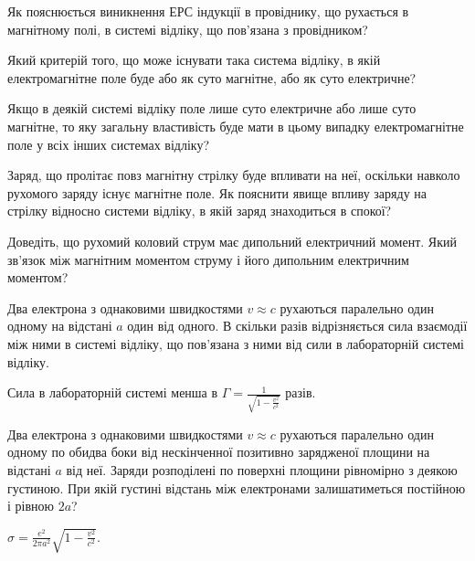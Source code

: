 \begin{problem}
    Як пояснюється виникнення ЕРС індукції в провіднику, що рухається в магнітному полі, в системі відліку, що  пов'язана з провідником?
\end{problem}

\begin{problem}
    Який критерій того, що може існувати така система відліку, в якій електромагнітне поле буде або як суто магнітне, або як суто електричне?
\end{problem}

\begin{problem}
    Якщо в деякій системі відліку поле лише суто електричне або лише суто магнітне, то яку загальну властивість буде мати в цьому випадку електромагнітне поле у всіх інших системах відліку?
\end{problem}

\begin{problem}
    Заряд, що пролітає повз магнітну стрілку буде впливати на неї, оскільки навколо рухомого заряду існує магнітне поле. Як пояснити явище впливу заряду на стрілку відносно системи відліку, в якій заряд знаходиться в спокої?
\end{problem}

\begin{problem}
    Доведіть, що рухомий коловий струм має дипольний електричний момент. Який зв'язок між магнітним моментом струму і його дипольним електричним моментом?
\end{problem}

\begin{problem}
    Два електрона з однаковими швидкостями $v \approx c$ рухаються паралельно один одному на відстані $a$ один від одного. В скільки разів відрізняється сила взаємодії між ними в системі відліку, що пов'язана з ними від сили в лабораторній системі відліку.
\begin{solution}
	Сила в лабораторній системі менша в $\Gamma = \frac{1}{\sqrt{1- \frac{v^2}{c^2}}}$ разів.
\end{solution}
\end{problem}

\begin{problem}
    Два електрона з однаковими швидкостями $v \approx c$ рухаються паралельно один одному по обидва боки від нескінченної позитивно зарядженої площини на відстані $a$ від неї. Заряди розподілені по поверхні площини рівномірно з деякою густиною. При якій густині відстань між електронами залишатиметься постійною і рівною $2a$?
\begin{solution}
	$\sigma  = \frac{e^2}{2\pi a^2}\sqrt{1 - \frac{v^2}{c^2}}$.
\end{solution}
\end{problem}

